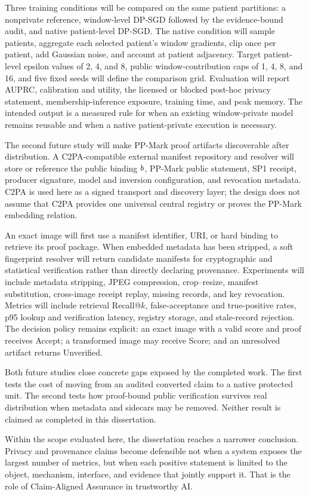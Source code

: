 Three training conditions will be compared on the same patient partitions: a
nonprivate reference, window-level DP-SGD followed by the evidence-bound audit,
and native patient-level DP-SGD.  The native condition will sample patients,
aggregate each selected patient's window gradients, clip once per patient, add
Gaussian noise, and account at patient adjacency.  Target patient-level epsilon
values of 2, 4, and 8, public window-contribution caps of 1, 4, 8, and 16, and five
fixed seeds will define the comparison grid.  Evaluation will report AUPRC,
calibration and utility, the licensed or blocked post-hoc privacy statement,
membership-inference exposure, training time, and peak memory.  The intended output
is a measured rule for when an existing window-private model remains reusable and
when a native patient-private execution is necessary.

The second future study will make PP-Mark proof artifacts discoverable after
distribution.  A C2PA-compatible external manifest repository and resolver will
store or reference the public binding \(b\), PP-Mark public statement,
SP1 receipt, producer signature, model and inversion configuration, and revocation
metadata.  C2PA is used here as a signed transport and discovery layer; the design
does not assume that C2PA provides one universal central registry or proves the
PP-Mark embedding relation.

An exact image will first use a manifest identifier, URI, or hard binding to
retrieve its proof package.  When embedded metadata has been stripped, a soft
fingerprint resolver will return candidate manifests for cryptographic and
statistical verification rather than directly declaring provenance.  Experiments
will include metadata stripping, JPEG compression, crop--resize, manifest
substitution, cross-image receipt replay, missing records, and key revocation.
Metrics will include retrieval Recall@\(k\), false-acceptance and true-positive
rates, p95 lookup and verification latency, registry storage, and stale-record
rejection.  The decision policy remains explicit: an exact image with a valid
score and proof receives \textsf{Accept}; a transformed image may receive
\textsf{Score}; and an unresolved artifact returns \textsf{Unverified}.

Both future studies close concrete gaps exposed by the completed work.  The first
tests the cost of moving from an audited converted claim to a native protected unit.
The second tests how proof-bound public verification survives real distribution
when metadata and sidecars may be removed.  Neither result is claimed as completed
in this dissertation.

Within the scope evaluated here, the dissertation reaches a narrower conclusion.
Privacy and provenance claims become defensible not when a system exposes the
largest number of metrics, but when each positive statement is limited to the
object, mechanism, interface, and evidence that jointly support it.  That is the
role of Claim-Aligned Assurance in trustworthy AI.
